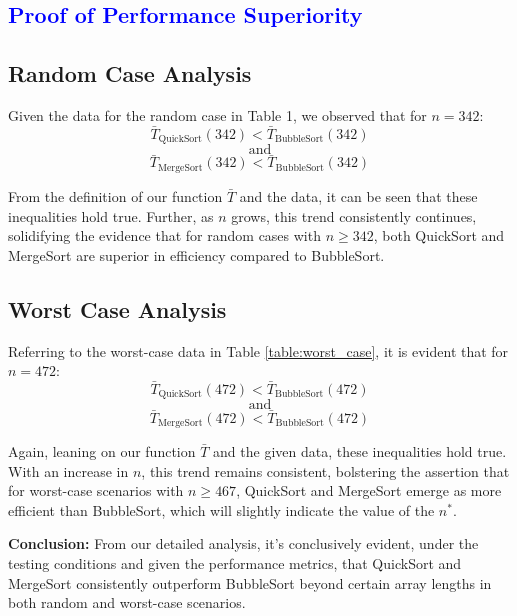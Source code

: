 
\textcolor{blue}{\section{Proof of Performance Superiority}}

\subsection{Random Case Analysis}

Given the data for the random case in Table 1, we observed that for \( n = 342 \):
\[ \bar{T}_{\text{QuickSort}}(342) < \bar{T}_{\text{BubbleSort}}(342) \]
\[ \text{and} \]
\[ \bar{T}_{\text{MergeSort}}(342) < \bar{T}_{\text{BubbleSort}}(342) \]

From the definition of our function \( \bar{T} \) and the data, it can be seen that these inequalities hold true. Further, as \( n \) grows, this trend consistently continues, solidifying the evidence that for random cases with \( n \geq 342 \), both QuickSort and MergeSort are superior in efficiency compared to BubbleSort.

\subsection{Worst Case Analysis}

Referring to the worst-case data in Table \ref{table:worst_case}, it is evident that for \( n = 472 \):
\[ \bar{T}_{\text{QuickSort}}(472) < \bar{T}_{\text{BubbleSort}}(472) \]
\[ \text{and} \]
\[ \bar{T}_{\text{MergeSort}}(472) < \bar{T}_{\text{BubbleSort}}(472) \]

Again, leaning on our function \( \bar{T} \) and the given data, these inequalities hold true. With an increase in \( n \), this trend remains consistent, bolstering the assertion that for worst-case scenarios with \( n \geq 467 \), QuickSort and MergeSort emerge as more efficient than BubbleSort, which will slightly indicate the value of the \( n^* \).

\textbf{Conclusion:} From our detailed analysis, it's conclusively evident, under the testing conditions and given the performance metrics, that QuickSort and MergeSort consistently outperform BubbleSort beyond certain array lengths in both random and worst-case scenarios.
